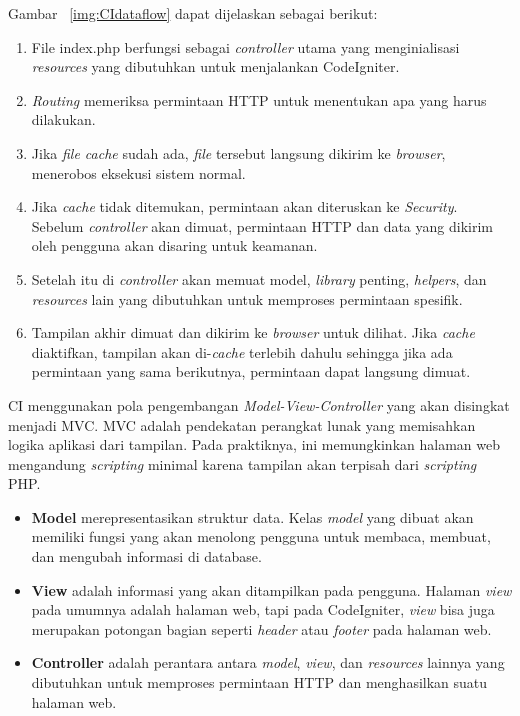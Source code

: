 Gambar ~\ref{img:CIdataflow} dapat dijelaskan sebagai berikut:
\begin{enumerate}
	\item File index.php berfungsi sebagai \textit{controller} utama yang menginialisasi \textit{resources} yang dibutuhkan untuk menjalankan CodeIgniter.
	\item \textit{Routing} memeriksa permintaan HTTP untuk menentukan apa yang harus dilakukan.
	\item Jika \textit{file cache} sudah ada, \textit{file} tersebut langsung dikirim ke \textit{browser}, menerobos eksekusi sistem normal.
	\item Jika \textit{cache} tidak ditemukan, permintaan akan diteruskan ke \textit{Security}. Sebelum \textit{controller} akan dimuat, permintaan HTTP dan data yang dikirim oleh pengguna akan disaring untuk keamanan.
	\item Setelah itu di \textit{controller} akan memuat model, \textit{library} penting, \textit{helpers}, dan \textit{resources} lain yang dibutuhkan untuk memproses permintaan spesifik.
	\item Tampilan akhir dimuat dan dikirim ke \textit{browser} untuk dilihat. Jika \textit{cache} diaktifkan, tampilan akan di-\textit{cache} terlebih dahulu sehingga jika ada permintaan yang sama berikutnya, permintaan dapat langsung dimuat.
\end{enumerate}

CI menggunakan pola pengembangan \textit{Model-View-Controller} yang akan disingkat menjadi MVC. MVC adalah pendekatan perangkat lunak yang memisahkan logika aplikasi dari tampilan. Pada praktiknya, ini memungkinkan halaman web mengandung \textit{scripting} minimal karena tampilan akan terpisah dari \textit{scripting} PHP.
\begin{itemize}
	\item \textbf{Model} merepresentasikan struktur data. Kelas \textit{model} yang dibuat akan memiliki fungsi yang akan menolong pengguna untuk membaca, membuat, dan mengubah informasi di database.
	\item \textbf{View} adalah informasi yang akan ditampilkan pada pengguna. Halaman \textit{view} pada umumnya adalah halaman web, tapi pada CodeIgniter, \textit{view} bisa juga merupakan potongan bagian seperti \textit{header} atau \textit{footer} pada halaman web.
	\item \textbf{Controller} adalah perantara antara \textit{model}, \textit{view}, dan \textit{resources} lainnya yang dibutuhkan untuk memproses permintaan HTTP dan menghasilkan suatu halaman web.
\end{itemize}

